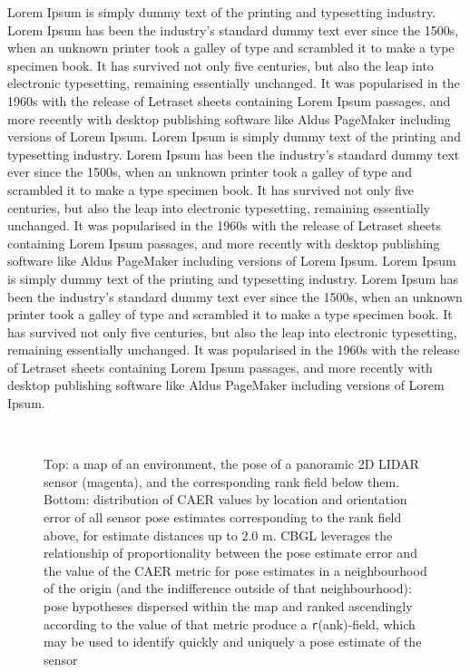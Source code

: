 Lorem Ipsum is simply dummy text of the printing and typesetting industry.
Lorem Ipsum has been the industry's standard dummy text ever since the 1500s,
when an unknown printer took a galley of type and scrambled it to make a type
specimen book. It has survived not only five centuries, but also the leap into
electronic typesetting, remaining essentially unchanged. It was popularised in
the 1960s with the release of Letraset sheets containing Lorem Ipsum passages,
and more recently with desktop publishing software like Aldus PageMaker
including versions of Lorem Ipsum. Lorem Ipsum is simply dummy text of the
printing and typesetting industry.  Lorem Ipsum has been the industry's
standard dummy text ever since the 1500s, when an unknown printer took a galley
of type and scrambled it to make a type specimen book. It has survived not only
five centuries, but also the leap into electronic typesetting, remaining
essentially unchanged. It was popularised in the 1960s with the release of
Letraset sheets containing Lorem Ipsum passages, and more recently with desktop
publishing software like Aldus PageMaker including versions of Lorem Ipsum.
Lorem Ipsum is simply dummy text of the printing and typesetting industry.
Lorem Ipsum has been the industry's standard dummy text ever since the 1500s,
when an unknown printer took a galley of type and scrambled it to make a type
specimen book. It has survived not only five centuries, but also the leap into
electronic typesetting, remaining essentially unchanged. It was popularised in
the 1960s with the release of Letraset sheets containing Lorem Ipsum passages,
and more recently with desktop publishing software like Aldus PageMaker
including versions of Lorem Ipsum.

\begin{figure}
  \subfloat{    \label{fig:a}} \vspace{-1.7cm}\\
  \subfloat{\hspace{-0.3cm} \label{fig:b}}
  \caption{\small
           Top: a map of an environment, the pose of a panoramic 2D LIDAR
           sensor (magenta), and the corresponding rank field below them.
           Bottom: distribution of CAER values by location and orientation
           error of all sensor pose estimates corresponding to the
           rank field above, for estimate distances up to $2.0$ m.
           CBGL leverages the relationship of proportionality between the pose
           estimate error and the value of the CAER metric for pose estimates
           in a neighbourhood of the origin (and the indifference outside of
           that neighbourhood): pose hypotheses dispersed within the map and
           ranked ascendingly according to the value of that metric produce a
           \texttt{r}(ank)-field, which may be used to identify quickly and
           uniquely a pose estimate of the sensor%
           }
  \vspace{-0.75cm}
  \label{fig:AB}
\end{figure}


